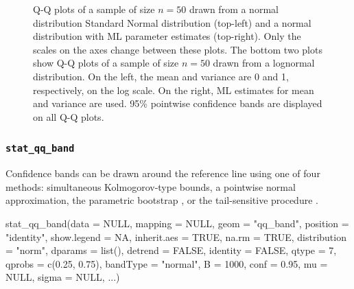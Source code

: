 \begin{Schunk}
\begin{figure}
\caption[Q-Q plots of a sample of size $n=50$ drawn from a normal distribution Standard Normal distribution (top-left) and a normal distribution with ML parameter estimates (top-right)]{Q-Q plots of a sample of size $n=50$ drawn from a normal distribution Standard Normal distribution (top-left) and a normal distribution with ML parameter estimates (top-right). Only the scales on the axes change between these plots. The bottom two plots show Q-Q plots of a sample of size $n=50$ drawn from a lognormal distribution. On the left, the mean and variance are 0 and 1, respectively, on the log scale. On the right, ML estimates for mean and variance are used. 95\% pointwise confidence bands are displayed on all Q-Q plots. }\label{fig:qqline}
\end{figure}
\end{Schunk}

\subsubsection{\texorpdfstring{\texttt{stat\_qq\_band}}{stat\_qq\_band}}\label{stat_qq_band}

Confidence bands can be drawn around the reference line using one of
four methods: simultaneous Kolmogorov-type bounds, a pointwise normal
approximation, the parametric bootstrap \citep{Davison:1997}, or the
tail-sensitive procedure \citep{Aldor-Noiman2013-xw}.

\begin{Schunk}
\begin{Sinput}
stat_qq_band(data = NULL,
             mapping = NULL,
             geom = "qq_band",
             position = "identity",
             show.legend = NA,
             inherit.aes = TRUE,
             na.rm = TRUE,
             distribution = "norm",
             dparams = list(),
             detrend = FALSE,
             identity = FALSE,
             qtype = 7,
             qprobs = c(0.25, 0.75),
             bandType = "normal",
             B = 1000,
             conf = 0.95,
             mu = NULL,
             sigma = NULL,
             ...)
\end{Sinput}
\end{Schunk}

